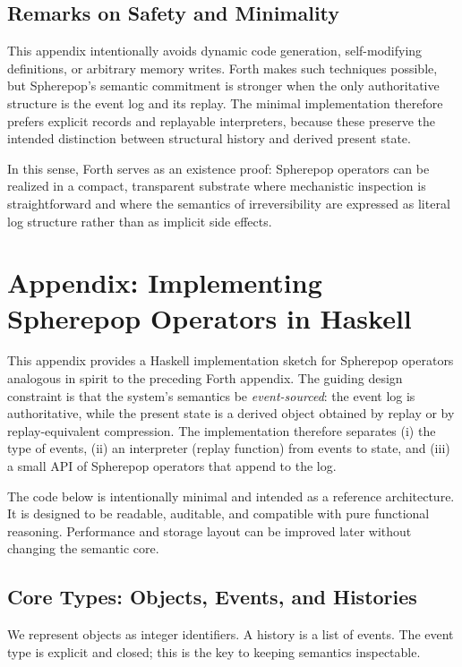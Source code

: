 \documentclass[11pt]{article}
\begin{document}
\subsection{Remarks on Safety and Minimality}

This appendix intentionally avoids dynamic code generation, self-modifying
definitions, or arbitrary memory writes. Forth makes such techniques possible,
but Spherepop’s semantic commitment is stronger when the only authoritative
structure is the event log and its replay. The minimal implementation therefore
prefers explicit records and replayable interpreters, because these preserve the
intended distinction between structural history and derived present state.

In this sense, Forth serves as an existence proof: Spherepop operators can be
realized in a compact, transparent substrate where mechanistic inspection is
straightforward and where the semantics of irreversibility are expressed as
literal log structure rather than as implicit side effects.

\section{Appendix: Implementing Spherepop Operators in Haskell}

This appendix provides a Haskell implementation sketch for Spherepop operators
analogous in spirit to the preceding Forth appendix. The guiding design
constraint is that the system’s semantics be \emph{event-sourced}: the event log
is authoritative, while the present state is a derived object obtained by replay
or by replay-equivalent compression. The implementation therefore separates (i)
the type of events, (ii) an interpreter (replay function) from events to state,
and (iii) a small API of Spherepop operators that append to the log.

The code below is intentionally minimal and intended as a reference
architecture. It is designed to be readable, auditable, and compatible with
pure functional reasoning. Performance and storage layout can be improved later
without changing the semantic core.

\subsection{Core Types: Objects, Events, and Histories}

We represent objects as integer identifiers. A history is a list of events. The
event type is explicit and closed; this is the key to keeping semantics
inspectable.
\end{document}
